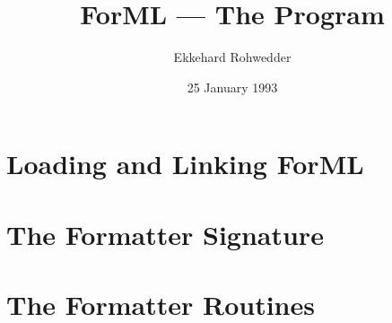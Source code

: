 \newcommand{\bsl}{/}
\newcommand{\ml}{\tt}

\oddsidemargin 0pt \evensidemargin 20pt \headheight 0pt
\headsep 0pt    %
\topmargin 0pt  %
\footheight 12pt \footskip 25pt \textheight 660pt \textwidth 469pt
\title{ForML --- The Program}
\author{Ekkehard Rohwedder}
\date{25 January 1993}
 
\maketitle 

\section{Loading and Linking ForML}


\section{The Formatter Signature}


\section{The Formatter Routines}



